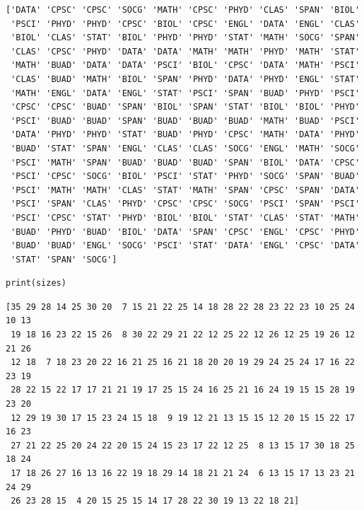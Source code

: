 \begin{Verbatim}[fontsize=\scriptsize,samepage=true,frame=leftline,framesep=1mm,framerule=1mm]
['DATA' 'CPSC' 'CPSC' 'SOCG' 'MATH' 'CPSC' 'PHYD' 'CLAS' 'SPAN' 'BIOL'
 'PSCI' 'PHYD' 'PHYD' 'CPSC' 'BIOL' 'CPSC' 'ENGL' 'DATA' 'ENGL' 'CLAS'
 'BIOL' 'CLAS' 'STAT' 'BIOL' 'PHYD' 'PHYD' 'STAT' 'MATH' 'SOCG' 'SPAN'
 'CLAS' 'CPSC' 'PHYD' 'DATA' 'DATA' 'MATH' 'MATH' 'PHYD' 'MATH' 'STAT'
 'MATH' 'BUAD' 'DATA' 'DATA' 'PSCI' 'BIOL' 'CPSC' 'DATA' 'MATH' 'PSCI'
 'CLAS' 'BUAD' 'MATH' 'BIOL' 'SPAN' 'PHYD' 'DATA' 'PHYD' 'ENGL' 'STAT'
 'MATH' 'ENGL' 'DATA' 'ENGL' 'STAT' 'PSCI' 'SPAN' 'BUAD' 'PHYD' 'PSCI'
 'CPSC' 'CPSC' 'BUAD' 'SPAN' 'BIOL' 'SPAN' 'STAT' 'BIOL' 'BIOL' 'PHYD'
 'PSCI' 'BUAD' 'BUAD' 'SPAN' 'BUAD' 'BUAD' 'BUAD' 'MATH' 'BUAD' 'PSCI'
 'DATA' 'PHYD' 'PHYD' 'STAT' 'BUAD' 'PHYD' 'CPSC' 'MATH' 'DATA' 'PHYD'
 'BUAD' 'STAT' 'SPAN' 'ENGL' 'CLAS' 'CLAS' 'SOCG' 'ENGL' 'MATH' 'SOCG'
 'PSCI' 'MATH' 'SPAN' 'BUAD' 'BUAD' 'BUAD' 'SPAN' 'BIOL' 'DATA' 'CPSC'
 'PSCI' 'CPSC' 'SOCG' 'BIOL' 'PSCI' 'STAT' 'PHYD' 'SOCG' 'SPAN' 'BUAD'
 'PSCI' 'MATH' 'MATH' 'CLAS' 'STAT' 'MATH' 'SPAN' 'CPSC' 'SPAN' 'DATA'
 'PSCI' 'SPAN' 'CLAS' 'PHYD' 'CPSC' 'CPSC' 'SOCG' 'PSCI' 'SPAN' 'PSCI'
 'PSCI' 'CPSC' 'STAT' 'PHYD' 'BIOL' 'BIOL' 'STAT' 'CLAS' 'STAT' 'MATH'
 'BUAD' 'PHYD' 'BUAD' 'BIOL' 'DATA' 'SPAN' 'CPSC' 'ENGL' 'CPSC' 'PHYD'
 'BUAD' 'BUAD' 'ENGL' 'SOCG' 'PSCI' 'STAT' 'DATA' 'ENGL' 'CPSC' 'DATA'
 'STAT' 'SPAN' 'SOCG']
\end{Verbatim}

\begin{Verbatim}[fontsize=\small,samepage=true,frame=single,framesep=3mm]
print(sizes)
\end{Verbatim}

\vspace{-.2in}

\begin{Verbatim}[fontsize=\scriptsize,samepage=true,frame=leftline,framesep=1mm,framerule=1mm]
[35 29 28 14 25 30 20  7 15 21 22 25 14 18 28 22 28 23 22 23 10 25 24 10 13
 19 18 16 23 22 15 26  8 30 22 29 21 22 12 25 22 12 26 12 25 19 26 12 21 26
 12 18  7 18 23 20 22 16 21 25 16 21 18 20 20 19 29 24 25 24 17 16 22 23 19
 28 22 15 22 17 17 21 21 19 17 25 15 24 16 25 21 16 24 19 15 15 28 19 23 20
 12 29 19 30 17 15 23 24 15 18  9 19 12 21 13 15 15 12 20 15 15 22 17 16 23
 27 21 22 25 20 24 22 20 15 24 15 23 17 22 12 25  8 13 15 17 30 18 25 18 24
 17 18 26 27 16 13 16 22 19 18 29 14 18 21 21 24  6 13 15 17 13 23 21 24 29
 26 23 28 15  4 20 15 25 15 14 17 28 22 30 19 13 22 18 21]
\end{Verbatim}

